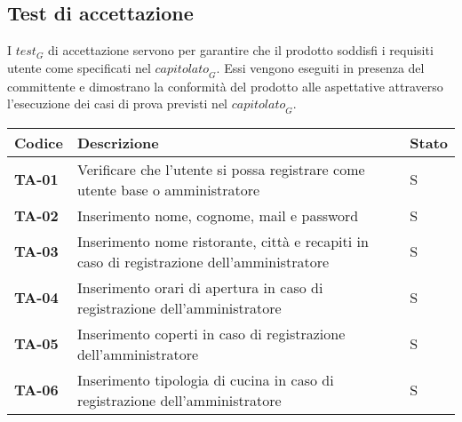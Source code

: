 \subsection{Test di accettazione}
I $\textit{test}_G$ di accettazione servono per garantire che il prodotto soddisfi i requisiti utente come specificati nel $\textit{capitolato}_G$. Essi vengono eseguiti in presenza del committente e dimostrano la conformità del
prodotto alle aspettative attraverso l’esecuzione dei casi di prova previsti nel $\textit{capitolato}_G$.
\newpage
    \begin{longtable}{|>{\centering\arraybackslash}p{1.5cm}|p{14cm}|p{1cm}|}
  \hline
  \rowcolor{gray!50}
  \textbf{Codice} & \textbf{Descrizione} & \textbf{Stato} \\
  \hline
  \textbf{TA-01} & Verificare che l'utente si possa registrare come utente base o amministratore &  S\\
  \hline
  \rowcolor{gray!10}
  \textbf{TA-02} & Inserimento nome, cognome, mail e password & S\\
  \hline
  \textbf{TA-03} & Inserimento nome ristorante, città e recapiti in caso di registrazione dell'amministratore & S\\
  \hline
  \rowcolor{gray!10}
  \textbf{TA-04} & Inserimento orari di apertura in caso di registrazione dell'amministratore & S\\
  \hline
   \textbf{TA-05} & Inserimento coperti in caso di registrazione dell'amministratore & S\\
   \hline
   \rowcolor{gray!10}
    \textbf{TA-06} & Inserimento tipologia di cucina in caso di registrazione dell'amministratore & S\\
    \hline
    

\end{longtable}
